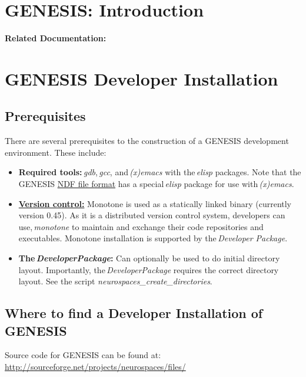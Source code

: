 \documentclass[12pt]{article}
\begin{document}
\section*{GENESIS: Introduction}

{\bf Related Documentation:}

\section*{GENESIS Developer Installation}

\subsection*{Prerequisites}

There are several prerequisites to the construction of a GENESIS development environment. These include:

\begin{itemize}

\item {\bf Required tools:}\,{\it gdb},\,{\it gcc}, and\,{\it (x)emacs} with the\,{\it elisp} packages. Note that the GENESIS \href{../ndf-file-format/ndf-file-format.tex}{NDF file format} has a special\,{\it elisp} package for use with\,{\it (x)emacs}.
\item \href{../version-control/version-control.tex}{{\bf Version control:}} Monotone is used as a statically linked binary (currently version 0.45). As it is a distributed version control system, developers can use,\,{\it monotone} to maintain and exchange their code repositories and executables. Monotone installation is supported by the\,{\it Developer Package}. 
\item {\bf  The\,{\it DeveloperPackage}:} Can optionally be used to do initial directory layout. Importantly, the\,{\it DeveloperPackage} requires the correct directory layout. See the script {\it neurospaces\_create\_directories}.

\end{itemize}

\subsection*{Where to find a Developer Installation of GENESIS}

Source code for GENESIS can be found at: \href{http://sourceforge.net/projects/neurospaces/files/}{http://sourceforge.net/projects/neurospaces/files/}
\end{document}
